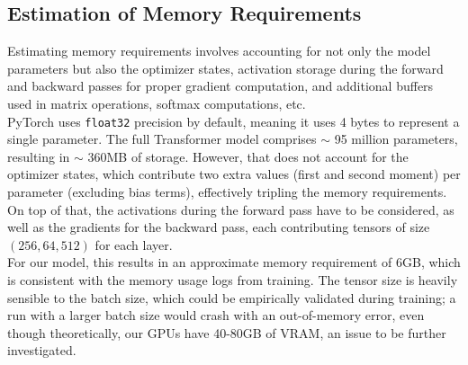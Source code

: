 \subsection{Estimation of Memory Requirements}
Estimating memory requirements involves accounting for not only the model parameters but also the optimizer states, activation storage during the forward and backward passes for proper gradient computation, and additional buffers used in matrix operations, softmax computations, etc.\\
PyTorch uses \texttt{float32} precision by default, meaning it uses 4 bytes to represent a single parameter.
The full Transformer model comprises \(\sim\) 95 million parameters, resulting in \(\sim\) 360MB of storage.
However, that does not account for the optimizer states, which contribute two extra values (first and second moment) per parameter (excluding bias terms), effectively tripling the memory requirements.
On top of that, the activations during the forward pass have to be considered, as well as the gradients for the backward pass, each contributing tensors of size \((256, 64, 512)\) for each layer.\\
For our model, this results in an approximate memory requirement of 6GB, which is consistent with the memory usage logs from training.
The tensor size is heavily sensible to the batch size, which could be empirically validated during training; a run with a larger batch size would crash with an out-of-memory error, even though theoretically, our GPUs have 40-80GB of VRAM, an issue to be further investigated.



